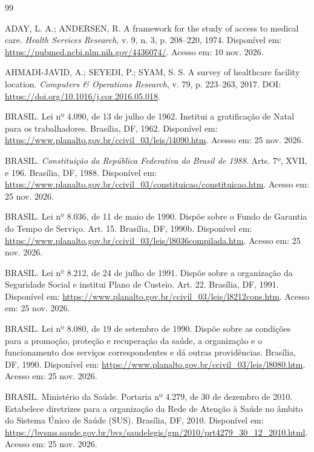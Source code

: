\documentclass[12pt,a4paper,oneside]{report}
\begin{document}
\begin{thebibliography}{99}

ADAY, L. A.; ANDERSEN, R. A framework for the study of access to medical care. \textit{Health Services Research}, v. 9, n. 3, p. 208--220, 1974. Disponível em: \url{https://pubmed.ncbi.nlm.nih.gov/4436074/}. Acesso em: 10 nov. 2026.

AHMADI-JAVID, A.; SEYEDI, P.; SYAM, S. S. A survey of healthcare facility location. \textit{Computers \& Operations Research}, v. 79, p. 223--263, 2017. DOI: \url{https://doi.org/10.1016/j.cor.2016.05.018}.

BRASIL. Lei nº 4.090, de 13 de julho de 1962. Institui a gratificação de Natal para os trabalhadores. Brasília, DF, 1962. Disponível em: \url{https://www.planalto.gov.br/ccivil_03/leis/l4090.htm}. Acesso em: 25 nov. 2026.

BRASIL. \textit{Constituição da República Federativa do Brasil de 1988}. Arts. 7º, XVII, e 196. Brasília, DF, 1988. Disponível em: \url{https://www.planalto.gov.br/ccivil_03/constituicao/constituicao.htm}. Acesso em: 25 nov. 2026.

BRASIL. Lei nº 8.036, de 11 de maio de 1990. Dispõe sobre o Fundo de Garantia do Tempo de Serviço. Art. 15. Brasília, DF, 1990b. Disponível em: \url{https://www.planalto.gov.br/ccivil_03/leis/l8036compilada.htm}. Acesso em: 25 nov. 2026.

BRASIL. Lei nº 8.212, de 24 de julho de 1991. Dispõe sobre a organização da Seguridade Social e institui Plano de Custeio. Art. 22. Brasília, DF, 1991. Disponível em: \url{https://www.planalto.gov.br/ccivil_03/leis/l8212cons.htm}. Acesso em: 25 nov. 2026.

BRASIL. Lei nº 8.080, de 19 de setembro de 1990. Dispõe sobre as condições para a promoção, proteção e recuperação da saúde, a organização e o funcionamento dos serviços correspondentes e dá outras providências. Brasília, DF, 1990. Disponível em: \url{https://www.planalto.gov.br/ccivil_03/leis/l8080.htm}. Acesso em: 25 nov. 2026.

BRASIL. Ministério da Saúde. Portaria nº 4.279, de 30 de dezembro de 2010. Estabelece diretrizes para a organização da Rede de Atenção à Saúde no âmbito do Sistema Único de Saúde (SUS). Brasília, DF, 2010. Disponível em: \url{https://bvsms.saude.gov.br/bvs/saudelegis/gm/2010/prt4279_30_12_2010.html}. Acesso em: 25 nov. 2026.


\end{thebibliography}
\end{document}
